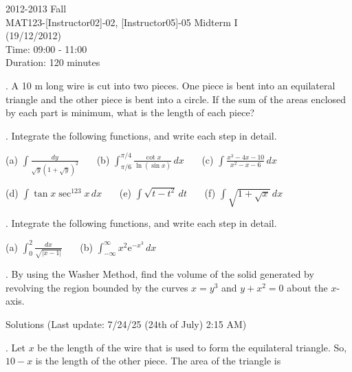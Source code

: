 \documentclass{article}
\begin{document}
\large

\begin{center}
2012-2013 Fall \\MAT123-[Instructor02]-02, [Instructor05]-05 Midterm I\\(19/12/2012)\\Time: 09:00 - 11:00\\Duration: 120 minutes
\end{center}

. A 10 m long wire is cut into two pieces. One piece is bent into an equilateral triangle and the other piece is bent into a circle. If the sum of the areas enclosed by each part is minimum, what is the length of each piece?

\hfill

. Integrate the following functions, and write each step in detail.

\hfill

(a) $\displaystyle\int\frac{dy}{\sqrt{y}\left(1+\sqrt y\right)^2}$ \ \ \ (b) $\displaystyle\int_{\pi/6}^{\pi/4}\frac{\cot x}{\ln(\sin x)}\,dx$ \ \ \ (c) $\displaystyle\int\frac{x^3-4x-10}{x^2-x-6}\,dx$

\hfill

(d) $\displaystyle \int\tan x \sec^{123}x\,dx$ \ \ \ (e) $\displaystyle\int\sqrt{t-t^2}\,dt$ \ \ \ (f) $\displaystyle\int\sqrt{1+\sqrt x}\,dx$

\hfill

. Integrate the following functions, and write each step in detail.

\hfill

(a) $\displaystyle \int_0^2\frac{dx}{\sqrt{|x-1|}}$ \ \ \ (b) $\displaystyle\int_{-\infty}^{\infty}x^2\mathrm{e}^{-x^3}\,dx$

\hfill

. By using the Washer Method, find the volume of the solid generated by revolving the region bounded by the curves $x=y^3$ and $y+x^2=0$ about the $x$-axis.

\hfill

\newpage

\begin{center}
Solutions (Last update: 7/24/25 (24th of July) 2:15 AM)
\end{center}

. Let $x$ be the length of the wire that is used to form the equilateral triangle. So, $10-x$ is the length of the other piece. The area of the triangle is
\end{document}

